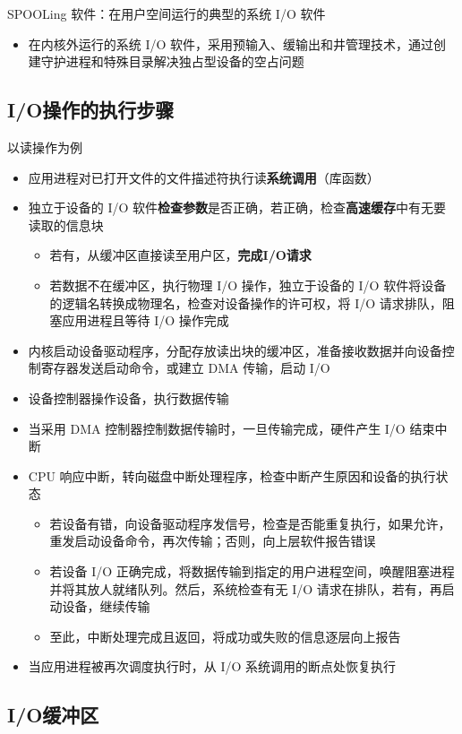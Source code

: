 \documentclass[cs4size,a4paper,10pt]{ctexart}
\begin{document}
	SPOOLing 软件：在用户空间运行的典型的系统 I/O 软件
	\begin{itemize}
		\item 在内核外运行的系统 I/O 软件，采用预输入、缓输出和井管理技术，通过创建守护进程和特殊目录解决独占型设备的空占问题
	\end{itemize}

	\subsection{I/O操作的执行步骤}
	以读操作为例
	\begin{itemize}
		\item 应用进程对已打开文件的文件描述符执行读\textbf{系统调用}（库函数）
		\item 独立于设备的 I/O 软件\textbf{检查参数}是否正确，若正确，检查\textbf{高速缓存}中有无要读取的信息块
		\begin{itemize}
			\item 若有，从缓冲区直接读至用户区，\textbf{完成I/O请求}
			\item 若数据不在缓冲区，执行物理 I/O 操作，独立于设备的 I/O 软件将设备的逻辑名转换成物理名，检查对设备操作的许可权，将 I/O 请求排队，阻塞应用进程且等待 I/O 操作完成
		\end{itemize}
		\item 内核启动设备驱动程序，分配存放读出块的缓冲区，准备接收数据并向设备控制寄存器发送启动命令，或建立 DMA 传输，启动 I/O
		\item 设备控制器操作设备，执行数据传输
		\item 当采用 DMA 控制器控制数据传输时，一旦传输完成，硬件产生 I/O 结束中断
		\item CPU 响应中断，转向磁盘中断处理程序，检查中断产生原因和设备的执行状态
		\begin{itemize}
			\item 若设备有错，向设备驱动程序发信号，检查是否能重复执行，如果允许，重发启动设备命令，再次传输；否则，向上层软件报告错误
			\item 若设备 I/O 正确完成，将数据传输到指定的用户进程空间，唤醒阻塞进程并将其放人就绪队列。然后，系统检查有无 I/O 请求在排队，若有，再启动设备，继续传输
			\item 至此，中断处理完成且返回，将成功或失败的信息逐层向上报告
		\end{itemize}
		\item 当应用进程被再次调度执行时，从 I/O 系统调用的断点处恢复执行
	\end{itemize}

	\subsection{I/O缓冲区}
\end{document}
